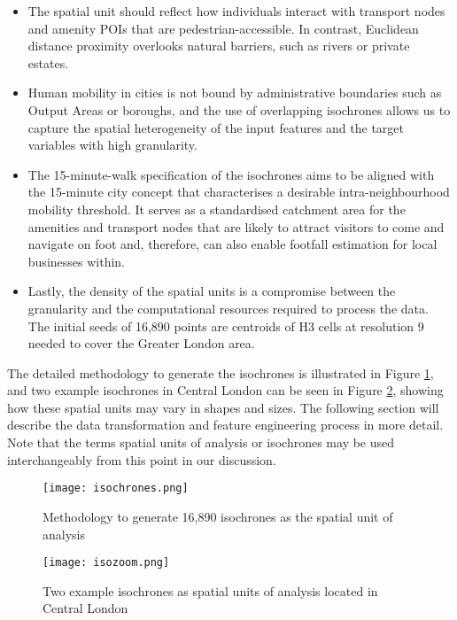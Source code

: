 \begin{itemize}
    \setlength\itemsep{0em}
    \item The spatial unit should reflect how individuals interact with transport nodes and amenity POIs that are pedestrian-accessible. In contrast, Euclidean distance proximity overlooks natural barriers, such as rivers or private estates. 
    \item Human mobility in cities is not bound by administrative boundaries such as Output Areas or boroughs, and the use of overlapping isochrones allows us to capture the spatial heterogeneity of the input features and the target variables with high granularity.
    \item The 15-minute-walk specification of the isochrones aims to be aligned with the 15-minute city concept that characterises a desirable intra-neighbourhood mobility threshold. It serves as a standardised catchment area for the amenities and transport nodes that are likely to attract visitors to come and navigate on foot and, therefore, can also enable footfall estimation for local businesses within. 
    \item Lastly, the density of the spatial units is a compromise between the granularity and the computational resources required to process the data. The initial seeds of 16,890 points are centroids of H3 cells at resolution 9 needed to cover the Greater London area. 
\end{itemize}

The detailed methodology to generate the isochrones is illustrated in Figure \ref{fig:isochrones}, and two example isochrones in Central London can be seen in Figure \ref{fig:isozoom}, showing how these spatial units may vary in shapes and sizes. The following section will describe the data transformation and feature engineering process in more detail. Note that the terms spatial units of analysis or isochrones may be used interchangeably from this point in our discussion.

\begin{figure}[ht]
    \centering
    \texttt{[image: isochrones.png]}
    \captionsetup{justification=centering}
    \caption{Methodology to generate 16,890 isochrones as the spatial unit of analysis}
    \label{fig:isochrones}
\end{figure}

\begin{figure}[!ht]
    \centering
    \texttt{[image: isozoom.png]}
    \caption{Two example isochrones as spatial units of analysis located in Central London}
    \label{fig:isozoom}
\end{figure}


